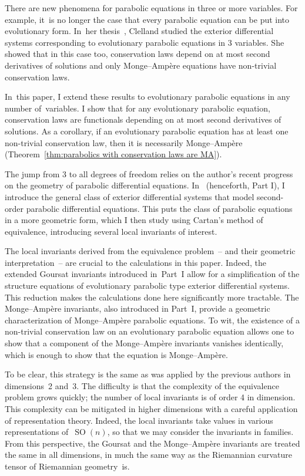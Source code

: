 \documentclass[10pt,a4paper]{amsart}
\DeclareMathOperator{\SO}{SO}
\numberwithin{equation}{section}
\begin{document}
There are new phenomena for parabolic equations in three or more variables. For example, it~is no longer the case that every parabolic equation can be put into evolutionary form. In~her thesis~\cite{Clelland_Thesis}, Clelland studied the exterior differential systems corresponding to evolutionary parabolic equations in 3 variables. She showed that in this case too, conservation laws depend on at most second derivatives of solutions and only Monge--Amp\`ere equations have non-trivial conservation laws.

In~this paper, I extend these results to evolutionary parabolic equations in any number of~variables. I show that for any evolutionary parabolic equation, conservation laws are functionals depending on at most second derivatives of solutions. As a corollary, if an evolutionary parabolic equation has at least one non-trivial conservation law, then it is necessarily Monge--Amp\`ere (Theorem~\ref{thm:parabolics with conservation laws are MA}).

The jump from 3 to all degrees of freedom relies on the author's recent progress on the geometry of parabolic differential equations.
In~\cite{McMillan:ParabolicsI} (henceforth, Part I), I introduce the general class of exterior differential systems that model second-order parabolic differential equations.
This puts the class of parabolic equations in a more geometric form, which I then study using Cartan's method of equivalence, introducing several local invariants of interest.

The local invariants derived from the equivalence problem~-- and their geometric interpretation~-- are crucial to the calculations in this paper.
Indeed, the extended Goursat invariants introduced in~Part~I allow for a simplification of the structure equations of evolutionary parabolic type exterior differential systems.
This reduction makes the calculations done here significantly more tractable.
The Monge--Amp\`ere invariants, also introduced in Part~I, provide a geometric characterization of Monge--Amp\`ere parabolic equations.
To wit, the existence of a non-trivial conservation law on an evolutionary parabolic equation allows one to show that a component of the Monge--Amp\`ere invariants vanishes identically, which is enough to show that the equation is Monge--Amp\`ere.

To be clear, this strategy is the same as was applied by the previous authors in dimen\-si\-ons~2 and~3.
The difficulty is that the complexity of the equivalence problem grows quickly; the number of local invariants is of order 4 in dimension.
This complexity can be mitigated in higher dimensions with a careful application of representation theory.
Indeed, the local invariants take values in various representations of~$\SO(n)$, so that we may consider the invariants in families.
From this perspective, the Goursat and the Monge--Amp\`ere invariants are treated the same in all dimensions, in much the same way as the Riemannian curvature tensor of Riemannian geometry~is.
\end{document}
